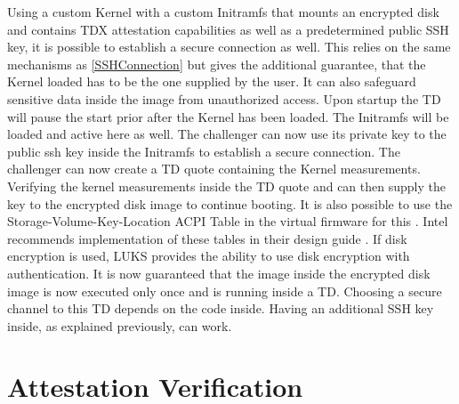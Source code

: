 
Using a custom Kernel with a custom Initramfs that mounts an encrypted disk and contains TDX attestation capabilities as well as a predetermined public SSH key, it is possible to establish a secure connection as well. This relies on the same mechanisms as \ref{SSHConnection} but gives the additional guarantee, that the Kernel loaded has to be the one supplied by the user. It can also safeguard sensitive data inside the image from unauthorized access. Upon startup the TD will pause the start prior after the Kernel has been loaded. The Initramfs will be loaded and active here as well. The challenger can now use its private key to the public ssh key inside the Initramfs to establish a secure connection. The challenger can now create a TD quote containing the Kernel measurements. Verifying the kernel measurements inside the TD quote and can then supply the key to the encrypted disk image to continue booting. It is also possible to use the Storage-Volume-Key-Location ACPI Table in the virtual firmware for this \cite{uefi_forum_inc_acpi_docu_2022}. Intel recommends implementation of these tables in their design guide \cite{intel_corporation_tdx-virtual-firmware-design-guide-rev-004-20231206pdf_2023}. If disk encryption is used, LUKS provides the ability to use disk encryption with authentication. It is now guaranteed that the image inside the encrypted disk image is now executed only once and is running inside a TD. Choosing a secure channel to this TD depends on the code inside. Having an additional SSH key inside, as explained previously, can work.

\section{Attestation Verification}

